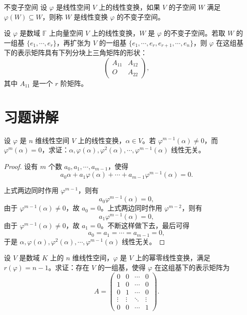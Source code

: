 \documentclass[lang=cn,12pt]{elegantbook}
\begin{document}
\begin{definition}{不变子空间}
    设 \(\varphi\) 是线性空间 \(V\) 上的线性变换，如果 \(V\) 的子空间 \(W\) 满足 \(\varphi(W) \subseteq W\)，则称 \(W\) 是线性变换 \(\varphi\) 的不变子空间。
\end{definition}

\begin{theorem}
    设 \(\varphi\) 是数域 \(\mathbb{F}\) 上向量空间 \(V\) 上的线性变换，\(W\) 是 \(\varphi\) 的不变子空间。若取 \(W\) 的一组基 \(\{e_1, \cdots, e_r\}\)，再扩张为 \(V\) 的一组基 \(\{e_1, \cdots, e_r, e_{r+1}, \cdots, e_n\}\)，则 \(\varphi\) 在这组基下的表示矩阵具有下列分块上三角矩阵的形状：
\[
\begin{pmatrix}
A_{11} & A_{12} \\
O & A_{22}
\end{pmatrix},
\]
其中 \(A_{11}\) 是一个 \(r\) 阶矩阵。
\end{theorem}


\section{习题讲解}

\begin{example}\label{ex4.8}
    设 \(\varphi\) 是 \(n\) 维线性空间 \(V\) 上的线性变换，\(\alpha \in V\)。若 \(\varphi^{m-1}(\alpha) \neq 0\)，而  
    \(\varphi^m(\alpha) = 0\)，求证：\(\alpha, \varphi(\alpha), \varphi^2(\alpha), \cdots, \varphi^{m-1}(\alpha)\) 线性无关。
\end{example}
    
\begin{proof}
    设有 \(m\) 个数 \(a_0, a_1, \cdots, a_{m-1}\)，使得  
    \[
    a_0\alpha + a_1\varphi(\alpha) + \cdots + a_{m-1}\varphi^{m-1}(\alpha) = 0.
    \]
    
    上式两边同时作用 \(\varphi^{m-1}\)，则有  
    \[
    a_0\varphi^{m-1}(\alpha) = 0,
    \]
    由于 \(\varphi^{m-1}(\alpha) \neq 0\)，故 \(a_0 = 0\)。上式两边同时作用 \(\varphi^{m-2}\)，则有  
    \[
    a_1\varphi^{m-1}(\alpha) = 0,
    \]
    由于 \(\varphi^{m-1}(\alpha) \neq 0\)，故 \(a_1 = 0\)。不断这样做下去，最后可得  
    \[
    a_0 = a_1 = \cdots = a_{m-1} = 0,
    \]
    于是 \(\alpha, \varphi(\alpha), \varphi^2(\alpha), \cdots, \varphi^{m-1}(\alpha)\) 线性无关。
\end{proof}

\begin{example}
    设 \( V \) 是数域 \( K \) 上的 \( n \) 维线性空间，\( \varphi \) 是 \( V \) 上的幂零线性变换，满足  
    \( r(\varphi) = n - 1 \)。求证：存在 \( V \) 的一组基，使得 \( \varphi \) 在这组基下的表示矩阵为  
    \[
    A = 
    \begin{pmatrix}
    0 & 0 & \cdots & 0 \\
    1 & 0 & \cdots & 0 \\
    0 & 1 & \cdots & 0 \\
    \vdots & \vdots & \ddots & \vdots \\
    0 & 0 & \cdots & 1
    \end{pmatrix}.
    \]
\end{example}
    
\end{document}
